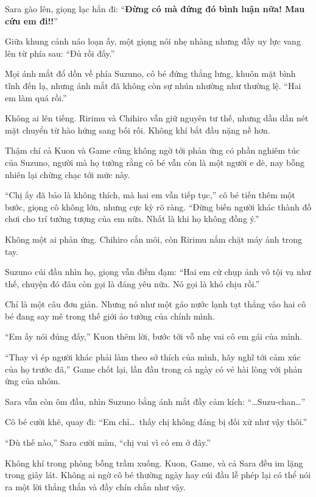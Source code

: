 \documentclass[../main.tex]{subfiles}
\begin{document}
Sara gào lên, giọng lạc hẳn đi: ``\textbf{Đừng có mà đứng đó bình luận nữa! Mau cứu em đi!!}''
\omk

Giữa khung cảnh náo loạn ấy, một giọng nói nhẹ nhàng nhưng đầy uy lực vang lên từ phía sau: ``Đủ rồi đấy.''

Mọi ánh mắt đổ dồn về phía Suzuno, cô bé đứng thẳng lưng, khuôn mặt bình tĩnh đến lạ, nhưng ánh mắt đã không còn sự nhún nhường như thường lệ. ``Hai em làm quá rồi.''

Không ai lên tiếng. Ririmu và Chihiro vẫn giữ nguyên tư thế, nhưng dần dần nét mặt chuyển từ hào hứng sang bối rối. Không khí bắt đầu nặng nề hơn.

Thậm chí cả Kuon và Game cũng không ngờ tới phản ứng có phần nghiêm túc của Suzuno, người mà họ tưởng rằng cô bé vẫn còn là một người e dè, nay bỗng nhiên lại chững chạc tới mức này.

``Chị ấy đã bảo là không thích, mà hai em vẫn tiếp tục,'' cô bé tiến thêm một bước, giọng cô không lớn, nhưng cực kỳ rõ ràng. ``Đừng biến người khác thành đồ chơi cho trí tưởng tượng của em nữa. Nhất là khi họ không đồng ý.''

Không một ai phản ứng. Chihiro cắn môi, còn Ririmu nắm chặt máy ảnh trong tay.

Suzuno cúi đầu nhìn họ, giọng vẫn điềm đạm: ``Hai em cứ chụp ảnh vô tội vạ như thế, chuyện đó đâu còn gọi là đáng yêu nữa. Nó gọi là khó chịu rồi.''

Chỉ là một câu đơn giản. Nhưng nó như một gáo nước lạnh tạt thẳng vào hai cô bé đang say mê trong thế giới ảo tưởng của chính mình.

``Em ấy nói đúng đấy,'' Kuon thêm lời, bước tới vỗ nhẹ vai cô em gái của mình.

``Thay vì ép người khác phải làm theo sở thích của mình, hãy nghĩ tới cảm xúc của họ trước đã,'' Game chốt lại, lần đầu trong cả ngày có vẻ hài lòng với phản ứng của nhóm.

Sara vẫn còn ôm đầu, nhìn Suzuno bằng ánh mắt đầy cảm kích: ``\dots Suzu-chan\dots''

Cô bé cười khẽ, quay đi: ``Em chỉ\dots\ thấy chị không đáng bị đối xử như vậy thôi.''

``Dù thế nào,'' Sara cười mỉm, ``chị vui vì có em ở đây.''

Không khí trong phòng bỗng trầm xuống. Kuon, Game, và cả Sara đều im lặng trong giây lát. Không ai ngờ cô bé thường ngày hay cúi đầu lễ phép lại có thể nói ra một lời thẳng thắn và đầy chín chắn như vậy.
\end{document}

